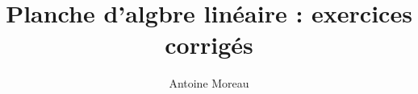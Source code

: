 \documentclass[a4paper,10pt]{article}
\title{Planche d'alg\g{e}bre lin\'eaire : exercices corrig\'es}
\author{Antoine Moreau}
\begin{document}
\maketitle

\begin{abstract}

\end{abstract}



\end{document}
